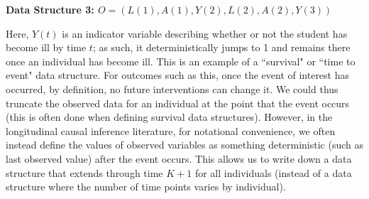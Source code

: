 \documentclass{exam}
\newenvironment{myfigure}{\captionsetup{type=mytype}}{}
\begin{document}
\begin{solution}

\end{solution}


\noindent\large\textbf{Data Structure 3: $O = (L(1), A(1), Y(2), L(2), A(2), Y(3))$}
\normalsize


Here, $Y(t)$ is an indicator variable describing whether or not the student has become ill by time $t$; as such, it deterministically jumps to 1 and remains there once an individual has become ill. This is an example of a ``survival" or ``time to event" data structure.  For outcomes such as this, once the event of interest has occurred, by definition, no future interventions can change it. We could thus truncate the observed data for an individual at the point that the event occurs (this is often done when defining survival data structures). However, in the longitudinal causal inference literature, for notational convenience, we often instead define the values of observed variables as something deterministic (such as last observed value) after the event occurs. This allows us to write down a data structure that extends through time $K+1$ for all individuals (instead of a data structure where the number of time points varies by individual).
\end{document}
